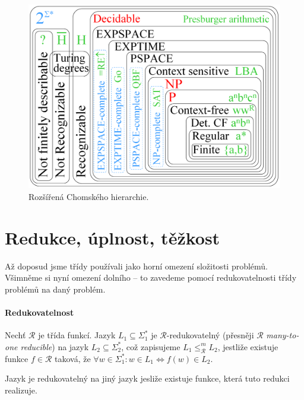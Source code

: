 \begin{figure}[H]
    \centering
    \includegraphics[width=0.9\linewidth]{chomsky_extended.pdf}
    \caption{Rozšířená Chomského hierarchie.}
\end{figure}


\section{Redukce, úplnost, těžkost}

\begin{compactitem}
    \item Až doposud jsme třídy používali jako horní omezení složitosti problémů. Všimněme si nyní omezení dolního -- to zavedeme pomocí redukovatelnosti třídy problémů na daný problém.
\end{compactitem}

\paragraph*{Redukovatelnost} Nechť $\mathcal{R}$ je třída funkcí. Jazyk $L_1 \subseteq \Sigma_1^*$ je $\mathcal{R}$-redukovatelný (přesněji $\mathcal{R}$ \textit{many-to-one reducible}) na jazyk $L_2 \subseteq \Sigma_2^*$, což zapisujeme $L_1 \leq_{\mathcal{R}}^m L_2$, jestliže existuje funkce $f \in \mathcal{R}$ taková, že $\forall w \in \Sigma_1^* : w \in L_1 \Leftrightarrow f(w) \in L_2$. \begin{compactitem}
    \item Jazyk je redukovatelný na jiný jazyk jesliže existuje funkce, která tuto redukci realizuje.
\end{compactitem}

